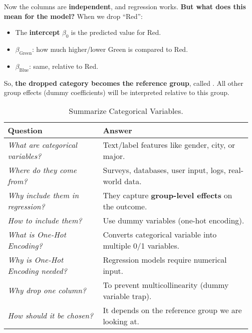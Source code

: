 \noindent
Now the columns are \textbf{independent}, and regression works. \textcolor{Green3}{ \textbf{But what does this mean for the model?}} When we drop ``Red'':
\begin{itemize}
    \item The \textbf{intercept} $\beta_0$ is the predicted value for Red.
    \item $\beta_{\text{Green}}$: how much higher/lower Green is compared to Red.
    \item $\beta_{\text{Blue}}$: same, relative to Red.
\end{itemize}
So, \textbf{the dropped category becomes the reference group}, called . All other group effects (dummy coefficients) will be interpreted relative to this group.

\begin{table}[!htp]
    \centering
    \begin{adjustbox}{width={\textwidth},totalheight={\textheight},keepaspectratio}
        \begin{tabular}{@{} p{15em} p{20em} @{}}
            \toprule
            Question & Answer \\
            \midrule
            \emph{What are categorical variables?} & Text/label features like gender, city, or major.          \\ [.5em]
            \emph{Where do they come from?}        & Surveys, databases, user input, logs, real-world data.    \\ [.5em]
            \emph{Why include them in regression?} & They capture \textbf{group-level effects} on the outcome. \\ [.5em]
            \emph{How to include them?}            & Use dummy variables (one-hot encoding).                   \\ [.5em]
            \emph{What is One-Hot Encoding?}       & Converts categorical variable into multiple 0/1 variables.\\ [.5em]
            \emph{Why is One-Hot Encoding needed?} & Regression models require numerical input.                \\ [.5em]
            \emph{Why drop one column?}            & To prevent multicollinearity (dummy variable trap).       \\ [.5em]
            \emph{How should it be chosen?}        & It depends on the reference group we are looking at.      \\
            \bottomrule
        \end{tabular}
    \end{adjustbox}
    \caption{Summarize Categorical Variables.}
\end{table}

